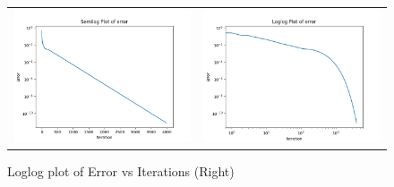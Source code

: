 \documentclass[11pt, a4paper]{article}
\begin{document}
            \begin{figure}[H]
                    \centering
                    \setlength\tabcolsep{2pt}
                    \begin{tabular}{cc}
                       \includegraphics[scale=0.5]{Fig2.png} &
                       \includegraphics[scale=0.5]{Fig3.png}
                    \end{tabular}
                    \caption{Semilog Plot of Error vs Iterations (Left)} \caption{Loglog plot of Error vs Iterations (Right)}
                \end{figure}
                
\end{document}
